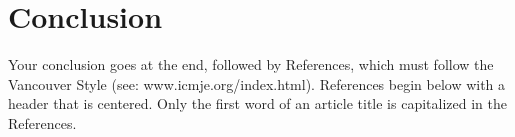 \section{Conclusion}
Your conclusion goes at the end, followed by References, which must follow the Vancouver Style (see: www.icmje.org/index.html). References begin below with a header that is centered. Only the first word of an article title is capitalized in the References. 